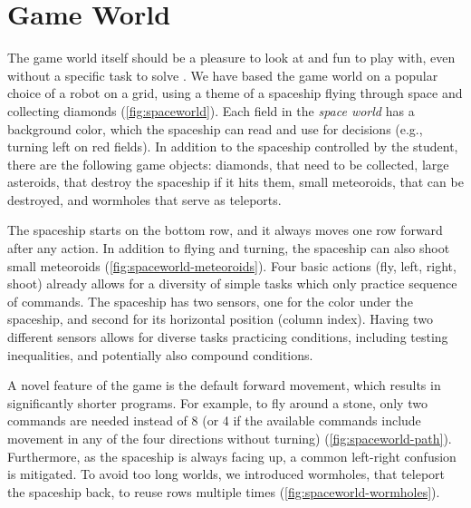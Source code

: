

\section{Game World}  %
\label{sec:robomission.game-world}

The game world itself should be a pleasure to look at and fun to play with,
even without a specific task to solve \cite{book-of-lenses}.
We have based the game world on a popular choice of a robot on a grid,
using a theme of a spaceship flying through space and collecting diamonds
(\cref{fig:spaceworld}).
Each field in the \emph{space world} has a background color, which
the spaceship can read and use for decisions (e.g., turning left on red fields).
In addition to the spaceship controlled by the student,
there are the following game objects:
diamonds, that need to be collected,
large asteroids, that destroy the spaceship if it hits them,
small meteoroids, that can be destroyed,
and wormholes that serve as teleports.

The spaceship starts on the bottom row, and it always moves one row forward
after any action. %
In addition to flying and turning, the spaceship can also shoot small meteoroids
(\cref{fig:spaceworld-meteoroids}).
Four basic actions (fly, left, right, shoot) already allows for a
diversity of simple tasks which only practice sequence of commands.
The spaceship has two sensors, one for the color under the spaceship, and
second for its horizontal position (column index). Having two different sensors allows
for diverse tasks practicing conditions, including testing inequalities, and
potentially also compound conditions.

A novel feature of the game is the default forward movement,
which results in significantly shorter programs.
For example, to fly around a stone, only two commands are needed %
instead of 8 (or 4 if the available commands include
movement in any of the four directions without turning)
(\cref{fig:spaceworld-path}).
Furthermore, as the spaceship is always facing up, a common left-right
confusion \cite{blockly-10-things} is mitigated.
To avoid too long worlds, we introduced wormholes, that teleport the
spaceship back, to reuse rows multiple times
(\cref{fig:spaceworld-wormholes}).


